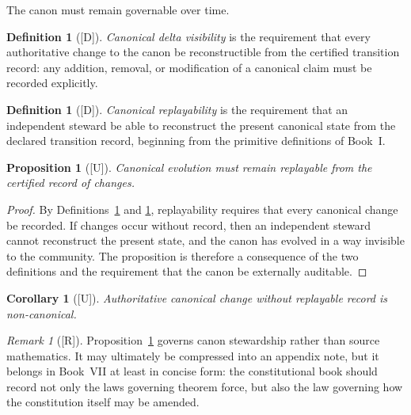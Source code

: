 \documentclass[12pt,oneside]{amsbook}
\theoremstyle{plain}
\newtheorem{proposition}[theorem]{Proposition}
\newtheorem{corollary}[theorem]{Corollary}
\theoremstyle{definition}
\newtheorem{definition}[theorem]{Definition}
\theoremstyle{remark}
\newtheorem{remark}[theorem]{Remark}
\newcommand{\status}[1]{\textup{[#1]}}
\begin{document}
The canon must remain governable over time.

\begin{definition}[\status{D}]\label{def:delta-visibility}
\emph{Canonical delta visibility} is the requirement that every
authoritative change to the canon be reconstructible from the
certified transition record: any addition, removal, or modification
of a canonical claim must be recorded explicitly.
\end{definition}

\begin{definition}[\status{D}]\label{def:replayability}
\emph{Canonical replayability} is the requirement that an independent
steward be able to reconstruct the present canonical state from the
declared transition record, beginning from the primitive definitions
of Book~I.
\end{definition}

\begin{proposition}[\status{U}]\label{prop:evolution-replayable}
Canonical evolution must remain replayable from the certified record
of changes.
\end{proposition}

\begin{proof}
By Definitions~\ref{def:delta-visibility} and \ref{def:replayability},
replayability requires that every canonical change be recorded.  If
changes occur without record, then an independent steward cannot
reconstruct the present state, and the canon has evolved in a way
invisible to the community.  The proposition is therefore a
consequence of the two definitions and the requirement that the canon
be externally auditable.
\end{proof}

\begin{corollary}[\status{U}]\label{cor:hidden-accretion-noncanonicalnical}
Authoritative canonical change without replayable record is
non-canonical.
\end{corollary}

\begin{remark}[\status{R}]\label{rmk:replayability-governance}
Proposition~\ref{prop:evolution-replayable} governs canon stewardship
rather than source mathematics.  It may ultimately be compressed into
an appendix note, but it belongs in Book~VII at least in concise form:
the constitutional book should record not only the laws governing
theorem force, but also the law governing how the constitution itself
may be amended.
\end{remark}
\end{document}
